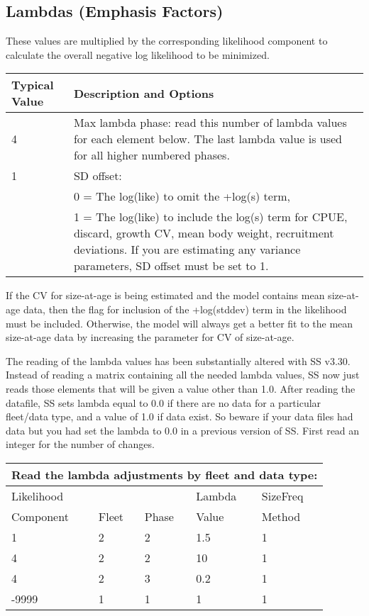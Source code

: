 
\subsection{Lambdas (Emphasis Factors)}
These values are multiplied by the corresponding likelihood component to calculate the overall negative log likelihood to be minimized.


\begin{tabular}{p{3cm} p{13cm}}
	\hline
	Typical Value & Description and Options\Tstrut\Bstrut\\
	\hline
	4 \Tstrut & Max lambda phase: read this number of lambda values for each element below.  The last lambda value is used for all higher numbered phases.\Bstrut\\
	1 & SD offset: \\
	  & 0 = The log(like) to omit the +log(s) term,\\
	  & 1 = The log(like) to include the log(s) term for CPUE, discard, growth CV, mean body weight, recruitment deviations. If you are estimating any variance parameters, SD offset must be set to 1.  \Bstrut\\
	\hline
\end{tabular}


If the CV for size-at-age is being estimated and the model contains mean size-at-age data, then the flag for inclusion of the +log(stddev) term in the likelihood must be included.  Otherwise, the model will always get a better fit to the mean size-at-age data by increasing the parameter for CV of size-at-age.

The reading of the lambda values has been substantially altered with SS v3.30.  Instead of reading a matrix containing all the needed lambda values, SS now just reads those elements that will be given a value other than 1.0.  After reading the datafile, SS sets lambda equal to 0.0 if there are no data for a particular fleet/data type, and a value of 1.0 if data exist.  So beware if your data files had data but you had set the lambda to 0.0 in a previous version of SS.  First read an integer for the number of changes.


\begin{longtable}{p{3cm} p{3cm} p{2cm} p{3cm} p{3cm}}

	\multicolumn{5}{l}{Read the lambda adjustments by fleet and data type:}\\
	\hline
	Likelihood &       &       & Lambda & SizeFreq\Tstrut\\
	Component  & Fleet & Phase & Value  & Method \Bstrut\\
	\hline
	1 & 2 & 2 & 1.5 & 1 \Tstrut\\
	4 & 2 & 2 & 10 & 1 \\
	4 & 2 & 3 & 0.2 & 1 \\
	-9999 & 1 & 1 & 1 & 1 \Bstrut\\
	\hline
\end{longtable}


